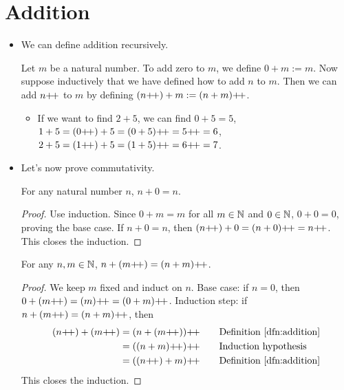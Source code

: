 \documentclass[../main.tex]{subfiles}
\begin{document}
\section{Addition}
\begin{itemize}
    \item We can define addition recursively.
    \begin{defn}\label{dfn:addition}
        Let $m$ be a natural number. To add zero to $m$, we define $0+m:=m$. Now suppose inductively that we have defined how to add $n$ to $m$. Then we can add $n{+\!+}$ to $m$ by defining $(n{+\!+})+m:=(n+m){+\!+}$.
    \end{defn}
    \begin{itemize}
        \item If we want to find $2+5$, we can find $0+5=5$, $1+5=(0{+\!+})+5=(0+5){+\!+}=5{+\!+}=6$, $2+5=(1{+\!+})+5=(1+5){+\!+}=6{+\!+}=7$.
    \end{itemize}
    \item Let's now prove commutativity.
    \begin{lem}\label{lem:nplus0}
        For any natural number $n$, $n+0=n$.
        \begin{proof}
            Use induction. Since $0+m=m$ for all $m\in\mathbb{N}$ and $0\in\mathbb{N}$, $0+0=0$, proving the base case. If $n+0=n$, then $(n{+\!+})+0=(n+0){+\!+}=n{+\!+}$. This closes the induction.
        \end{proof}
    \end{lem}
    \begin{lem}\label{lem:nplusmpplus}
        For any $n,m\in\mathbb{N}$, $n+(m{+\!+})=(n+m){+\!+}$.
        \begin{proof}
            We keep $m$ fixed and induct on $n$. Base case: if $n=0$, then $0+(m{+\!+})=(m){+\!+}=(0+m){+\!+}$. Induction step: if $n+(m{+\!+})=(n+m){+\!+}$, then
            \begin{align*}
                (n\pplus)+(m\pplus) &= (n+(m\pplus))\pplus\tag*{Definition \ref{dfn:addition}}\\
                &= ((n+m)\pplus)\pplus\tag*{Induction hypothesis}\\
                &= ((n\pplus)+m)\pplus\tag*{Definition \ref{dfn:addition}}
            \end{align*}
            This closes the induction.
        \end{proof}
    \end{lem}
    \begin{prop}\label{prp:commutativity}

\end{prop}
\end{itemize}
\end{document}
